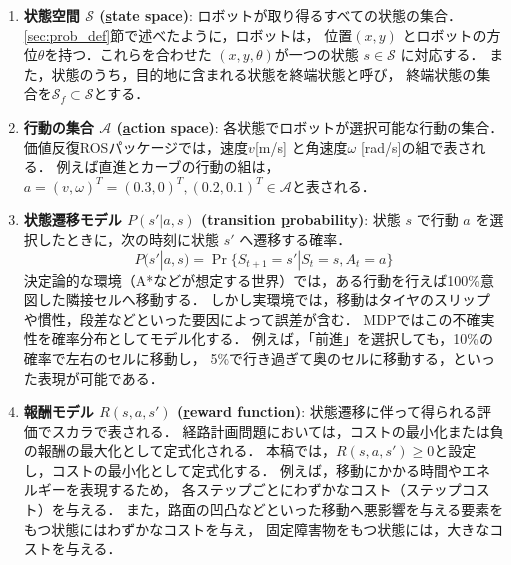 \begin{enumerate}
    \item \textbf{状態空間 $\mathcal{S}$ (\underline{s}tate space)}:
    ロボットが取り得るすべての状態の集合．
	\ref{sec:prob_def}節で述べたように，ロボットは，
	位置$(x, y)$ とロボットの方位$\theta$を持つ．これらを合わせた
	$(x, y, \theta)$が一つの状態 $s \in \mathcal{S}$ に対応する．
	また，状態のうち，目的地に含まれる状態を終端状態と呼び，
	終端状態の集合を$\mathcal{S}_f \subset \mathcal{S}$とする．

    \item \textbf{行動の集合 $\mathcal{A}$ (\underline{a}ction space)}:
    各状態でロボットが選択可能な行動の集合．
	価値反復ROSパッケージでは，速度$v$[m/s]%
	と角速度$\omega$ [rad/s]の組で表される．
	例えば直進とカーブの行動の組は，
	$a = (v, \omega)^T = (0.3, 0)^T, (0.2, 0.1)^T \in \mathcal{A}$と表される．

    \item \textbf{状態遷移モデル $P(s' | a, s)$ (transition \underline{p}robability)}:
    状態 $s$ で行動 $a$ を選択したときに，次の時刻に状態 $s'$ へ遷移する確率．
	\begin{equation}
        	P(s' | a, s) = \Pr\{S_{t+1}=s' | S_t=s, A_t=a\}
    	\end{equation}
    	決定論的な環境（A*などが想定する世界）では，ある行動を行えば100\%意図した隣接セルへ移動する．
	しかし実環境では，移動はタイヤのスリップや慣性，段差などといった要因によって誤差が含む．
	MDPではこの不確実性を確率分布としてモデル化する．
	例えば，「前進」を選択しても，10\%の確率で左右のセルに移動し，
	5\%で行き過ぎて奥のセルに移動する，といった表現が可能である．

    \item \textbf{報酬モデル $R(s, a, s')$ (\underline{r}eward function)}:
    状態遷移に伴って得られる評価でスカラで表される．
	経路計画問題においては，コストの最小化または負の報酬の最大化として定式化される．
	本稿では，$R(s, a, s') \ge 0$と設定し，コストの最小化として定式化する．
    	例えば，移動にかかる時間やエネルギーを表現するため，
	各ステップごとにわずかなコスト（ステップコスト）を与える．
	また，路面の凹凸などといった移動へ悪影響を与える要素をもつ状態にはわずかなコストを与え，
	固定障害物をもつ状態には，大きなコストを与える．
\end{enumerate}

